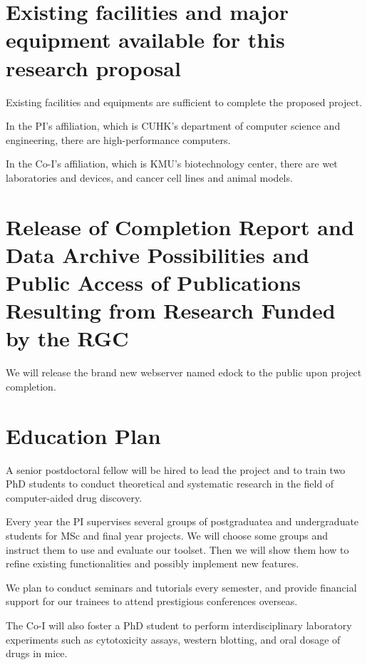 \documentclass[a4paper,12pt]{article}
\begin{document}
\section*{Existing facilities and major equipment available for this research proposal}

Existing facilities and equipments are sufficient to complete the proposed project.

In the PI’s affiliation, which is CUHK’s department of computer science and engineering, there are high-performance computers.

In the Co-I’s affiliation, which is KMU’s biotechnology center, there are wet laboratories and devices, and cancer cell lines and animal models.

\section*{Release of Completion Report and Data Archive Possibilities and Public Access of Publications Resulting from Research Funded by the RGC}

We will release the brand new webserver named edock to the public upon project completion.


\section*{Education Plan}

A senior postdoctoral fellow will be hired to lead the project and to train two PhD students to conduct theoretical and systematic research in the field of computer-aided drug discovery.

Every year the PI supervises several groups of postgraduatea and undergraduate students for MSc and final year projects. We will choose some groups and instruct them to use and evaluate our toolset. Then we will show them how to refine existing functionalities and possibly implement new features.

We plan to conduct seminars and tutorials every semester, and provide financial support for our trainees to attend prestigious conferences overseas.

The Co-I will also foster a PhD student to perform interdisciplinary laboratory experiments such as cytotoxicity assays, western blotting, and oral dosage of drugs in mice.

\newpage
\linespread{0.5}
\footnotesize



\end{document}
